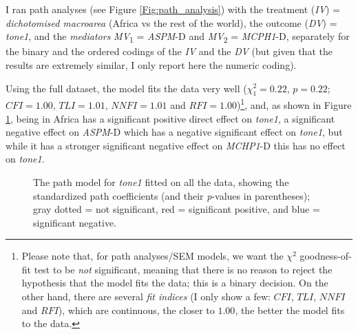 \documentclass[twoside,onecolumn]{article}
\begin{document}
I ran path analyses (see Figure \ref{Fig:path_analysis}) with the treatment (\textit{IV}) = \textit{dichotomised macroarea} (Africa vs the rest of the world), the outcome (\textit{DV}) = \textit{tone1}, and the \textit{mediators} \textit{MV}\textsubscript{1} = \textit{ASPM}-D and \textit{MV}\textsubscript{2} = \textit{MCPH1}-D, separately for the binary and the ordered codings of the \textit{IV} and the \textit{DV} (but given that the results are extremely similar, I only report here the numeric coding).

Using the full dataset, the model fits the data very well ($\chi^2_{1} = 0.22$, $p = 0.22$; $CFI=1.00$, $TLI=1.01$, $NNFI=1.01$ and $RFI=1.00$)\footnote{Please note that, for path analyses/SEM models, we want the $\chi^2$ goodness-of-fit test to be \emph{not} significant, meaning that there is no reason to reject the hypothesis that the model fits the data; this is a binary decision. On the other hand, there are several \emph{fit indices} (I only show a few: $CFI$, $TLI$, $NNFI$ and $RFI$), which are continuous, the closer to $1.00$, the better the model fits to the data.}, and, as shown in Figure \ref{Fig:tone1_path_all}, being in Africa has a significant positive direct effect on \textit{tone1}, a significant negative effect on \textit{ASPM}-D which has a negative significant effect on \textit{tone1}, but while it has a stronger significant negative effect on \textit{MCHP1}-D this has no effect on \textit{tone1}.

\begin{figure}[h]
  \centering


  \caption{The path model for \textit{tone1} fitted on all the data, showing the standardized path coefficients (and their \textit{p}-values in parentheses); gray dotted = not significant, red = significant positive, and blue = significant negative. }
  \label{Fig:tone1_path_all}
\end{figure}
\end{document}
